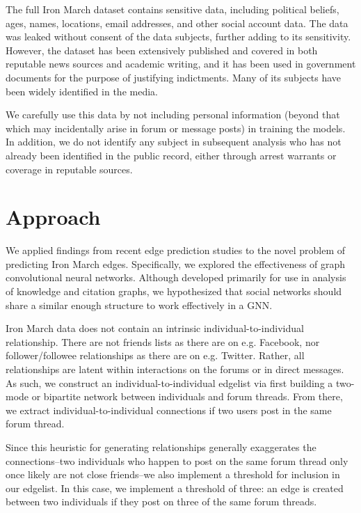 \documentclass[10pt,twocolumn,letterpaper]{article}
\begin{document}
The full Iron March dataset contains sensitive data, including political beliefs, ages, names, locations, email addresses, and other social account data. The data was leaked without consent of the data subjects, further adding to its sensitivity. However, the dataset has been extensively published and covered in both reputable news sources and academic writing, and it has been used in government documents for the purpose of justifying indictments. Many of its subjects have been widely identified in the media. 

We carefully use this data by not including personal information (beyond that which may incidentally arise in forum or message posts) in training the models. In addition, we do not identify any subject in subsequent analysis who has not already been identified in the public record, either through arrest warrants or coverage in reputable sources.

\section{Approach}

We applied findings from recent edge prediction studies to the novel problem of predicting Iron March edges. Specifically, we explored the effectiveness of graph convolutional neural networks. Although developed primarily for use in analysis of knowledge and citation graphs, we hypothesized that social networks should share a similar enough structure to work effectively in a GNN. 

Iron March data does not contain an intrinsic individual-to-individual relationship. There are not friends lists as there are on e.g. Facebook, nor follower/followee relationships as there are on e.g. Twitter. Rather, all relationships are latent within interactions on the forums or in direct messages. As such, we construct an individual-to-individual edgelist via first building a two-mode or bipartite network between individuals and forum threads. From there, we extract individual-to-individual connections if two users post in the same forum thread.

Since this heuristic for generating relationships generally exaggerates the connections--two individuals who happen to post on the same forum thread only once likely are not close friends--we also implement a threshold for inclusion in our edgelist. In this case, we implement a threshold of three: an edge is created between two individuals if they post on three of the same forum threads.
\end{document}

